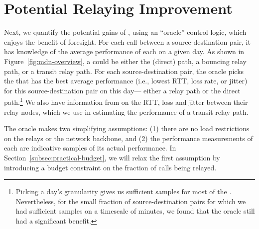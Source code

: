 \section{Potential Relaying Improvement}
\label{sec:via:potential}



Next, we quantify the potential gains of \hybrid, using an ``oracle'' control logic, which enjoys the benefit of foresight. For each call between a source-destination pair, it has knowledge of the average performance of each {\em \option} on a given day. As shown in Figure~\ref{fig:mdn-overview}, a \option could be either the \direct (direct) path, a bouncing relay path, or a transit relay path.
For each source-destination pair, the oracle picks the \option that has the best average performance (i.e., lowest RTT, loss rate, or jitter) for this source-destination pair on this day--- either a relay path or the direct path.\footnote{Picking a day's granularity gives us sufficient samples for most of the \options. Nevertheless, for the small fraction of source-destination pairs for which we had sufficient samples {on a timescale of minutes}, we found that the oracle still had a significant benefit.} We also have information from \skype on the RTT, loss and jitter between their relay nodes, which we use in estimating the performance of a transit relay path. 

The oracle makes two simplifying assumptions: (1) there are no load restrictions on the relays or the network backbone, and (2) the performance measurements of each \option are indicative samples of its actual performance.
In Section~\ref{subsec:practical-budget}, we will relax the first assumption by introducing a budget constraint on the fraction of calls being relayed.

